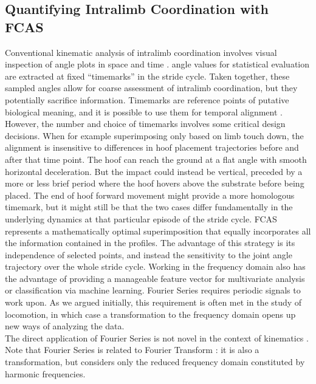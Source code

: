 \subsection{Quantifying Intralimb Coordination with FCAS}
Conventional kinematic analysis of intralimb coordination involves visual inspection of  angle plots in space and time \citep{Irschick1999,Fischer2002,Stoessel2012,Schmidt2008,Day2007,Polk2002,Nyakatura2010}.
 angle values for statistical evaluation are extracted at fixed ``timemarks'' in the stride cycle.
Taken together, these sampled  angles allow for coarse assessment of intralimb coordination, but they potentially sacrifice information.
Timemarks are reference points of putative biological meaning, and it is possible to use them for temporal alignment \citep[e.g.][]{HsiaoWecksler2010}.
However, the number and choice of timemarks involves some critical design decisions.
When for example superimposing only based on limb touch down, the alignment is insensitive to differences in hoof placement trajectories before and after that time point.
The hoof can reach the ground at a flat  angle with smooth horizontal deceleration.
But the impact could instead be vertical, preceded by a more or less brief period where the hoof hovers above the substrate before being placed.
The end of hoof forward movement might provide a more homologous timemark, but it might still be that the two cases differ fundamentally in the underlying dynamics at that particular episode of the stride cycle.
FCAS represents a mathematically optimal superimposition that equally incorporates all the information contained in the profiles.
The advantage of this strategy is its independence of selected points, and instead the sensitivity to the joint angle trajectory over the whole stride cycle.
Working in the frequency domain also has the advantage of providing a manageable feature vector for multivariate analysis or classification via machine learning.
Fourier Series requires periodic signals to work upon.
As we argued initially, this requirement is often met in the study of locomotion, in which case a transformation to the frequency domain opens up new ways of analyzing the data.
\\The direct application of Fourier Series \citep{Fourier1822,Gray1995,Bracewell2000} is not novel in the context of kinematics \citep[e.g.][]{Bernstein1935,Webb2007,Wheat2006,Pike2002}.
Note that Fourier Series is related to Fourier Transform \citep[cf.][]{Bracewell2000,Robertson2018}: it is also a transformation, but considers only the reduced frequency domain constituted by harmonic frequencies.
